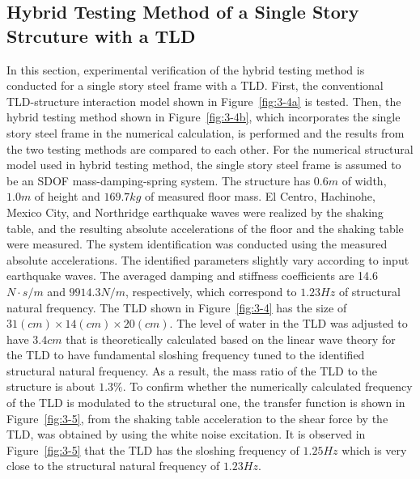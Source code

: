 \clearpage
\subsection{Hybrid Testing Method of a Single Story Strcuture with a TLD}
In this section, experimental verification of the hybrid testing method is conducted for a single story steel frame with a TLD. First, the conventional TLD-structure interaction model shown in Figure~\ref{fig:3-4a} is tested. Then, the hybrid testing method shown in Figure~\ref{fig:3-4b}, which incorporates the single story steel frame in the numerical calculation, is performed and the results from the two testing methods are compared to each other.
For the numerical structural model used in hybrid testing method, the single story steel frame is assumed to be an SDOF mass-damping-spring system. The structure has $0.6m$ of width, $1.0m$ of height and $169.7kg$ of measured floor mass. El Centro, Hachinohe, Mexico City, and Northridge earthquake waves were realized by the shaking table, and the resulting absolute accelerations of the floor and the shaking table were measured. The system identification was conducted using the measured absolute accelerations. The identified parameters slightly vary according to input earthquake waves. The averaged damping and stiffness coefficients are 14.6$N\cdot s/m$ and $9914.3N/m$, respectively, which correspond to $1.23Hz$ of structural natural frequency. The TLD shown in Figure~\ref{fig:3-4} has the size of $31(cm)\times14(cm)\times20(cm)$. The level of water in the TLD was adjusted to have $3.4cm$ that is theoretically calculated based on the linear wave theory\citep{soong1997passive} for the TLD to have fundamental sloshing frequency tuned to the identified structural natural frequency. As a result, the mass ratio of the TLD to the structure is about $1.3\%$. To confirm whether the numerically calculated frequency of the TLD is modulated to the structural one, the transfer function is shown in Figure~\ref{fig:3-5}, from the shaking table acceleration to the shear force by the TLD, was obtained by using the white noise excitation. It is observed in Figure~\ref{fig:3-5} that the TLD has the sloshing frequency of $1.25Hz$ which is very close to the structural natural frequency of $1.23Hz$.

